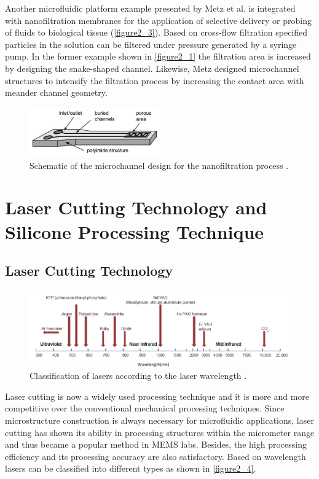 Another microfluidic platform example presented by Metz et al. \cite{metz2003polyimide} is integrated with nanofiltration membranes for the application of selective delivery or probing of fluids to biological tissue (\autoref{figure2_3}). Based on cross-flow filtration specified particles in the solution can be filtered under pressure generated by a syringe pump. In the former example shown in \autoref{figure2_1} the filtration area is increased by designing the snake-shaped channel. Likewise, Metz designed microchannel structures to intensify the filtration process by increasing the contact area with meander channel geometry. 

\begin{figure}[ht]%
\centering
\includegraphics[width=0.5\textwidth]{figures/literaturereview/figure2_3}%
\caption{Schematic of the microchannel design for the nanofiltration process \cite{metz2003polyimide}.}%
\label{figure2_3}%
\end{figure}

\section{Laser Cutting Technology and Silicone Processing Technique}
\label{2_2}
\subsection{Laser Cutting Technology}
\label{2_2_1}

\begin{figure}[!b]%
\centering
\includegraphics[width=1\textwidth]{figures/literaturereview/figure2_4}%
\caption{Classification of lasers according to the laser wavelength \cite{simpson2012basic}.}%
\label{figure2_4}%
\end{figure}

Laser cutting is now a widely used processing technique and it is more and more competitive over the conventional mechanical processing techniques. Since microstructure construction is always necessary for microfluidic applications, laser cutting has shown its ability in processing structures within the micrometer range and thus became a popular method in MEMS labs. Besides, the high processing efficiency and its processing accuracy are also satisfactory. Based on wavelength lasers can be classified into different types as shown in \autoref{figure2_4}. 

